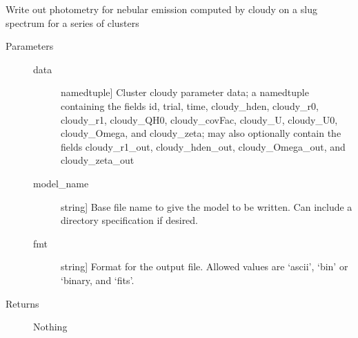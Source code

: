 \documentclass[letterpaper,10pt,english]{sphinxmanual}
\begin{document}
\begin{fulllineitems}
\label{\detokenize{cloudy:slugpy.cloudy.write_cluster_cloudyparams}}
Write out photometry for nebular emission computed by cloudy on a
slug spectrum for a series of clusters
\begin{description}
\item[{Parameters}] \leavevmode\begin{description}
\item[{data}] \leavevmode{[}namedtuple{]}
Cluster cloudy parameter data; a namedtuple containing the
fields id, trial, time, cloudy\_hden, cloudy\_r0, 
cloudy\_r1, cloudy\_QH0, cloudy\_covFac, cloudy\_U, cloudy\_U0,
cloudy\_Omega, and cloudy\_zeta; may also optionally contain
the fields cloudy\_r1\_out, cloudy\_hden\_out, cloudy\_Omega\_out,
and cloudy\_zeta\_out

\item[{model\_name}] \leavevmode{[}string{]}
Base file name to give the model to be written. Can include a
directory specification if desired.

\item[{fmt}] \leavevmode{[}string{]}
Format for the output file. Allowed values are ‘ascii’, ‘bin’
or ‘binary, and ‘fits’.

\end{description}

\item[{Returns}] \leavevmode
Nothing

\end{description}

\end{fulllineitems}

\end{document}
